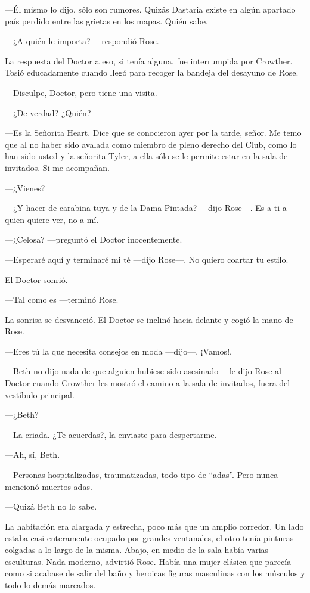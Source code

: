 {---Él mismo lo dijo, sólo son rumores. Quizás Dastaria existe en algún
apartado país perdido entre las grietas en los mapas. Quién sabe.}

{---¿A quién le importa? ---respondió Rose.}

{La respuesta del Doctor a eso, si tenía alguna, fue interrumpida por
	Crowther. Tosió educadamente cuando llegó para recoger la bandeja del
desayuno de Rose.}

{---Disculpe, Doctor, pero tiene una visita.}

{---¿De verdad? ¿Quién?}

{---Es la Señorita Heart. Dice que se conocieron ayer por la tarde,
	señor. Me temo que al no haber sido avalada como miembro de pleno
	derecho del Club, como lo han sido usted y la señorita Tyler, a ella
sólo se le permite estar en la sala de invitados. Si me acompañan.}

{---¿Vienes?}

{---¿Y hacer de carabina tuya y de la Dama Pintada? ---dijo Rose---. Es
a ti a quien quiere ver, no a mí.}

{---¿Celosa? ---preguntó el Doctor inocentemente.}

{---Esperaré aquí y terminaré mi té ---dijo Rose---. No quiero coartar
tu estilo.}

{El Doctor sonrió.}

{---Tal como es ---terminó Rose.}

{La sonrisa se desvaneció. El Doctor se inclinó hacia delante y cogió la
mano de Rose.}

{---Eres tú la que necesita consejos en moda ---dijo---. ¡Vamos!.}

{---Beth no dijo nada de que alguien hubiese sido asesinado ---le dijo
	Rose al Doctor cuando Crowther les mostró el camino a la sala de
invitados, fuera del vestíbulo principal.}

{---¿Beth?}

{---La criada. ¿Te acuerdas?, la enviaste para despertarme.}

{---Ah, sí, Beth.}

{---Personas hospitalizadas, traumatizadas, todo tipo de ``adas''. Pero
nunca mencionó muertos-adas.}

{---Quizá Beth no lo sabe.}

{La habitación era alargada y estrecha, poco más que un amplio corredor.
	Un lado estaba casi enteramente ocupado por grandes ventanales, el otro
	tenía pinturas colgadas a lo largo de la misma. Abajo, en medio de la
	sala había varias esculturas. Nada moderno, advirtió Rose. Había una
	mujer clásica que parecía como si acabase de salir del baño y heroicas
figuras masculinas con los músculos y todo lo demás marcados.}

